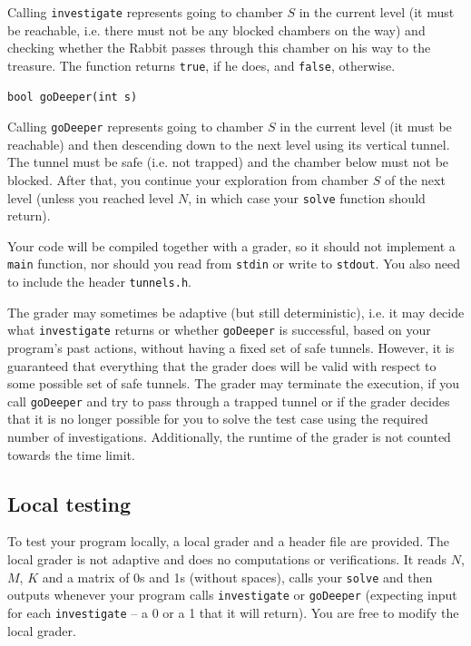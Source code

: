 \documentclass[12pt]{article}
\begin{document}
Calling \verb|investigate| represents going to chamber $S$ in the current level (it must be reachable, i.e. there must not be any blocked chambers on the way) and checking whether the Rabbit passes through this chamber on his way to the treasure. The function returns \verb|true|, if he does, and \verb|false|, otherwise.

\begin{verbatim}
bool goDeeper(int s)
\end{verbatim}

Calling \verb|goDeeper| represents going to chamber $S$ in the current level (it must be reachable) and then descending down to the next level using its vertical tunnel. The tunnel must be safe (i.e. not trapped) and the chamber below must not be blocked. After that, you continue your exploration from chamber $S$ of the next level (unless you reached level $N$, in which case your \verb|solve| function should return).

Your code will be compiled together with a grader, so it should not implement a \verb|main| function, nor should you read from \verb|stdin| or write to \verb|stdout|. You also need to include the header \verb|tunnels.h|.

The grader may sometimes be adaptive (but still deterministic), i.e. it may decide what \verb|investigate| returns or whether \verb|goDeeper| is successful, based on your program's past actions, without having a fixed set of safe tunnels. However, it is guaranteed that everything that the grader does will be valid with respect to some possible set of safe tunnels. The grader may terminate the execution, if you call \verb|goDeeper| and try to pass through a trapped tunnel or if the grader decides that it is no longer possible for you to solve the test case using the required number of investigations. Additionally, the runtime of the grader is not counted towards the time limit.

\subsection{Local testing}

To test your program locally, a local grader and a header file are provided. The local grader is not adaptive and does no computations or verifications. It reads $N$, $M$, $K$ and a matrix of 0s and 1s (without spaces), calls your \verb|solve| and then outputs whenever your program calls \verb|investigate| or \verb|goDeeper| (expecting input for each \verb|investigate| -- a 0 or a 1 that it will return). You are free to modify the local grader.
\end{document}
